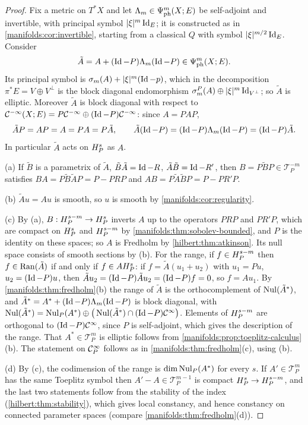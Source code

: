 \begin{proof}
Fix a metric on $T^*X$ and let $\Lambda_m\in\Psi^{m}_{\mathrm{ph}}(X;E)$ be self-adjoint and
invertible, with principal symbol $|\xi|^m\operatorname{Id}_E$; it is constructed as in
\cref{manifolds:cor:invertible}, starting from a classical $Q$ with symbol
$|\xi|^{m/2}\operatorname{Id}_E$. Consider
\begin{equation*}
\tilde A=A+(\operatorname{Id}-P)\Lambda_m(\operatorname{Id}-P)\in\Psi^{m}_{\mathrm{ph}}(X;E).
\end{equation*}
Its principal symbol is $\sigma_m(A)+|\xi|^m(\operatorname{Id}-p)$, which in the decomposition
$\pi^*E=V\oplus V^\perp$ is the block diagonal endomorphism
$\sigma^P_m(A)\oplus|\xi|^m\operatorname{Id}_{V^\perp}$; so $\tilde A$ is elliptic. Moreover $\tilde A$ is
block diagonal with respect to $\mathcal{C}^{-\infty}(X;E)=P\mathcal{C}^{-\infty}\oplus(\operatorname{Id}-P)\mathcal{C}^{-\infty}$: since $A=PAP$,
\begin{equation*}
\tilde AP=AP=A=PA=P\tilde A,\qquad \tilde A(\operatorname{Id}-P)=(\operatorname{Id}-P)\Lambda_m(\operatorname{Id}-P)=(\operatorname{Id}-P)\tilde A .
\end{equation*}
In particular $\tilde A$ acts on $H^{s}_P$ as $A$.

(a) If $\tilde B$ is a parametrix of $\tilde A$, $\tilde B\tilde A=\operatorname{Id}-R$, $\tilde A\tilde B=\operatorname{Id}-R'$, then
$B=P\tilde BP\in\mathcal T^{-m}_P$ satisfies
$BA=P\tilde B\tilde AP=P-PRP$ and $AB=P\tilde A\tilde BP=P-PR'P$.

(b) $\tilde Au=Au$ is smooth, so $u$ is smooth by \cref{manifolds:cor:regularity}.

(c) By (a), $B:H^{s-m}_P\to H^{s}_P$ inverts $A$ up to the operators $PRP$ and $PR'P$, which are
compact on $H^{s}_P$ and $H^{s-m}_P$ by \cref{manifolds:thm:sobolev-bounded}, and $P$ is
the identity on these spaces; so $A$ is Fredholm by \cref{hilbert:thm:atkinson}. Its
null space consists of smooth sections by (b). For the range, if $f\in H^{s-m}_P$ then
$f\in\operatorname{Ran}(\tilde A)$ if and only if $f\in AH^{s}_P$: if $f=\tilde A(u_1+u_2)$ with $u_1=Pu$,
$u_2=(\operatorname{Id}-P)u$, then $\tilde Au_2=(\operatorname{Id}-P)\tilde Au_2=(\operatorname{Id}-P)f=0$, so $f=Au_1$. By
\cref{manifolds:thm:fredholm}(b) the range of $\tilde A$ is the orthocomplement of
$\operatorname{Nul}(\tilde A^*)$, and $\tilde A^*=A^*+(\operatorname{Id}-P)\Lambda_m(\operatorname{Id}-P)$ is block diagonal, with
$\operatorname{Nul}(\tilde A^*)=\operatorname{Nul}_P(A^*)\oplus\big(\operatorname{Nul}(\tilde A^*)\cap(\operatorname{Id}-P)\mathcal{C}^\infty\big)$. Elements of
$H^{s-m}_P$ are orthogonal to $(\operatorname{Id}-P)\mathcal{C}^\infty$, since $P$ is self-adjoint, which gives the
description of the range. That $A^*\in\mathcal T^m_P$ is elliptic follows from
\cref{manifolds:prop:toeplitz-calculus}(b). The statement on $\mathcal{C}^\infty_P$ follows as in
\cref{manifolds:thm:fredholm}(c), using (b).

(d) By (c), the codimension of the range is $\dim\operatorname{Nul}_P(A^*)$ for every $s$. If $A'\in\mathcal T^m_P$
has the same Toeplitz symbol then $A'-A\in\mathcal T^{m-1}_P$ is compact
$H^{s}_P\to H^{s-m}_P$, and the last two statements follow from the stability of the
index (\cref{hilbert:thm:stability}), which gives local constancy, and hence constancy
on connected parameter spaces (compare \cref{manifolds:thm:fredholm}(d)).
\end{proof}

